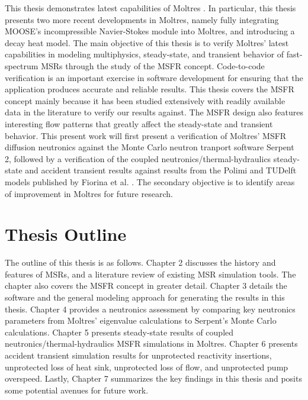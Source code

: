 This thesis demonstrates latest capabilities of Moltres
\cite{lindsay_introduction_2018}.
In particular, this thesis presents two more recent
developments in Moltres, namely fully integrating \gls{MOOSE}'s incompressible
Navier-Stokes module into Moltres, and introducing a
decay heat model.
The main objective of this thesis is to verify Moltres'
latest capabilities in modeling multiphysics, steady-state, and transient
behavior of fast-spectrum \glspl{MSR} through the study of the \gls{MSFR}
concept. Code-to-code verification is an important exercise in software
development for ensuring that the application produces accurate and reliable
results. This thesis covers the \gls{MSFR} concept mainly because it has been
studied extensively with readily available data in the literature to verify
our results against. The \gls{MSFR} design also features interesting flow
patterns that greatly affect the steady-state and transient behavior. This
present work will first present a verification of Moltres' \gls{MSFR}
diffusion neutronics against the Monte Carlo neutron tranport software
Serpent 2, followed by a verification of
the coupled neutronics/thermal-hydraulics steady-state and accident transient
results against results from the Polimi and TUDelft models published by
Fiorina et al. \cite{fiorina_modelling_2014}. The
secondary objective is to identify areas of improvement in Moltres for future
research.

\section{Thesis Outline}

The outline of this thesis is as follows. Chapter 2 discusses the history and
features of \glspl{MSR}, and a literature review of existing \gls{MSR}
simulation tools. The chapter also covers the \gls{MSFR} concept in greater
detail. Chapter 3 details the software and the general modeling
approach for generating the results in this thesis. Chapter 4 provides a
neutronics assessment by comparing key neutronics parameters from Moltres'
eigenvalue calculations to Serpent's Monte Carlo calculations. Chapter 5
presents steady-state results of coupled neutronics/thermal-hydraulics
\gls{MSFR} simulations in Moltres. Chapter 6 presents accident transient
simulation results for unprotected reactivity insertions, unprotected loss of
heat sink, unprotected loss of flow, and unprotected pump overspeed. Lastly,
Chapter 7 summarizes the key findings in this thesis
and posits some potential avenues for future work.
